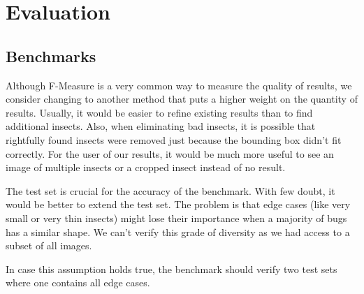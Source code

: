 %
\section{Evaluation}
\label{sec_eval}

\subsection{Benchmarks}
Although F-Measure is a very common way to measure the quality of results, we consider changing  to another method that puts a higher weight on the quantity of results.
Usually, it would be easier to refine existing results than to find additional insects. 
Also, when eliminating bad insects, it is possible that rightfully found insects were removed just because the bounding box didn't fit correctly.
For the user of our results, it would be much more useful to see an image of multiple insects or a cropped insect instead of no result.

The test set is crucial for the accuracy of the benchmark. 
With few doubt, it would be better to extend the test set. 
The problem is that edge cases (like very small or very thin insects) might lose their importance when a majority of bugs has a similar shape.
We can't verify this grade of diversity as we had access to a subset of all images.

In case this assumption holds true, the benchmark should verify two test sets where one contains all edge cases.
